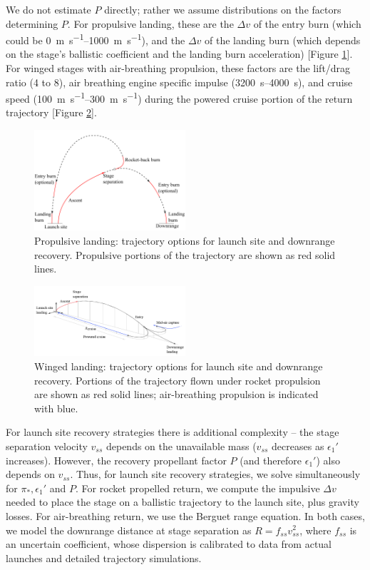 \documentclass{iaf-iac}
\begin{document}
\begin{multicols}{2}
We do not estimate $P$ directly; rather we assume distributions on the factors determining $P$. For propulsive landing, these are the $\Delta v$ of the entry burn (which could be \SIrange{0}{1000}{\meter\per\second}), and the $\Delta v$ of the landing burn (which depends on the stage's ballistic coefficient and the landing burn acceleration) [Figure \ref{fig:propulsive_landing}]. For winged stages with air-breathing propulsion, these factors are the lift/drag ratio (4 to 8), air breathing engine specific impulse (\SIrange{3200}{4000}{\second}), and cruise speed (\SIrange{100}{300}{\meter\per\second}) during the powered cruise portion of the return trajectory [Figure \ref{fig:flyback_trajectory}].

\begin{figure}[H]
    \centering
    \includegraphics[width=0.5\textwidth]{propulsive_landing}
    \caption{\label{fig:propulsive_landing} Propulsive landing: trajectory options for launch site and downrange recovery. Propulsive portions of the trajectory are shown as red solid lines.}
\end{figure}

\begin{figure}[H]
    \centering
    \includegraphics[width=0.5\textwidth]{flyback_trajectory_cropped}
    \caption{\label{fig:flyback_trajectory} Winged landing: trajectory options for launch site and downrange recovery. Portions of the trajectory flown under rocket propulsion are shown as red solid lines; air-breathing propulsion is indicated with blue.}
\end{figure}

For launch site recovery strategies there is additional complexity -- the stage separation velocity $v_{ss}$ depends on the unavailable mass ($v_{ss}$ decreases as $\epsilon_1'$ increases). However, the recovery propellant factor $P$ (and therefore $\epsilon_1'$) also depends on $v_{ss}$. Thus, for launch site recovery strategies, we solve simultaneously for $\pi_*, \epsilon_1'$ and $P$. For rocket propelled return, we compute the impulsive $\Delta v$ needed to place the stage on a ballistic trajectory to the launch site, plus gravity losses. For air-breathing return, we use the Berguet range equation. In both cases, we model the downrange distance at stage separation as $R = f_{ss} v_{ss}^2$, where $f_{ss}$ is an uncertain coefficient, whose dispersion is calibrated to data from actual launches and detailed trajectory simulations.


\end{multicols}
\end{document}
